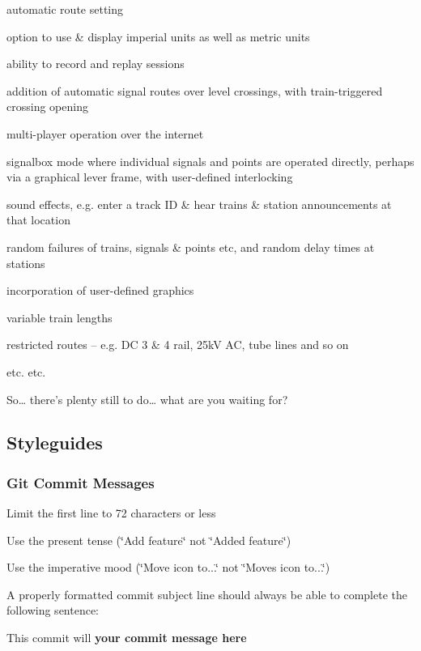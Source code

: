\begin{DoxyItemize}
\item automatic route setting
\item option to use \& display imperial units as well as metric units
\item ability to record and replay sessions
\item addition of automatic signal routes over level crossings, with train-\/triggered crossing opening
\item multi-\/player operation over the internet
\item signalbox mode where individual signals and points are operated directly, perhaps via a graphical lever frame, with user-\/defined interlocking
\item sound effects, e.\+g. enter a track ID \& hear trains \& station announcements at that location
\item random failures of trains, signals \& points etc, and random delay times at stations
\item incorporation of user-\/defined graphics
\item variable train lengths
\item restricted routes – e.\+g. DC 3 \& 4 rail, 25kV AC, tube lines and so on
\item etc. etc.
\end{DoxyItemize}

So… there’s plenty still to do… what are you waiting for?

\subsection*{Styleguides}

\subsubsection*{Git Commit Messages}


\begin{DoxyItemize}
\item Limit the first line to 72 characters or less
\item Use the present tense (\char`\"{}\+Add feature\char`\"{} not \char`\"{}\+Added feature\char`\"{})
\item Use the imperative mood (\char`\"{}\+Move icon to...\char`\"{} not \char`\"{}\+Moves icon to...\char`\"{})
\item A properly formatted commit subject line should always be able to complete the following sentence\+:
\begin{DoxyItemize}
\item This commit will {\bfseries your commit message here} 
\end{DoxyItemize}
\end{DoxyItemize}